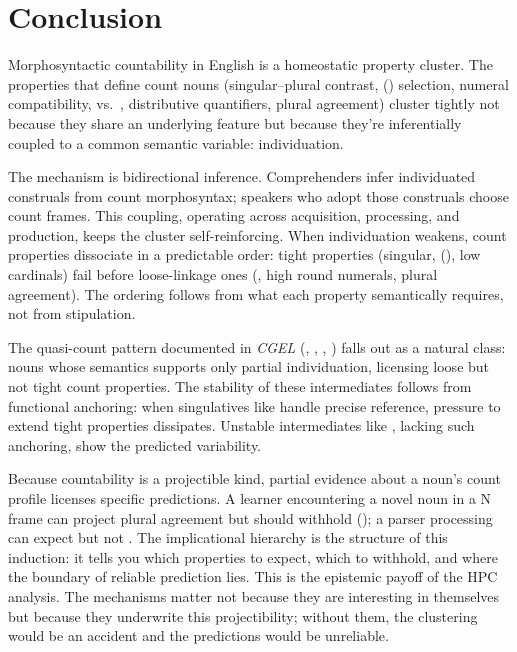 \documentclass[12pt,a4paper]{article}
\begin{document}
\section{Conclusion}\label{sec:conclusion}

Morphosyntactic countability in English is a homeostatic property cluster. The properties that define count nouns (singular--plural contrast, () selection, numeral compatibility,  vs.\ , distributive quantifiers, plural agreement) cluster tightly not because they share an underlying feature but because they're inferentially coupled to a common semantic variable: individuation.

The mechanism is bidirectional inference. Comprehenders infer individuated construals from count morphosyntax; speakers who adopt those construals choose count frames. This coupling, operating across acquisition, processing, and production, keeps the cluster self-reinforcing. When individuation weakens, count properties dissociate in a predictable order: tight properties (singular, (), low cardinals) fail before loose-linkage ones (, high round numerals, plural agreement). The ordering follows from what each property semantically requires, not from stipulation.

The quasi-count pattern documented in \textit{CGEL} (, , , ) falls out as a natural class: nouns whose semantics supports only partial individuation, licensing loose but not tight count properties. The stability of these intermediates follows from functional anchoring: when singulatives like  handle precise reference, pressure to extend tight properties dissipates. Unstable intermediates like , lacking such anchoring, show the predicted variability.

Because countability is a projectible kind, partial evidence about a noun's count profile licenses specific predictions. A learner encountering a novel noun in a  N frame can project plural agreement but should withhold (); a parser processing  can expect  but not . The implicational hierarchy is the structure of this induction: it tells you which properties to expect, which to withhold, and where the boundary of reliable prediction lies. This is the epistemic payoff of the HPC analysis. The mechanisms matter not because they are interesting in themselves but because they underwrite this projectibility; without them, the clustering would be an accident and the predictions would be unreliable.
\end{document}
